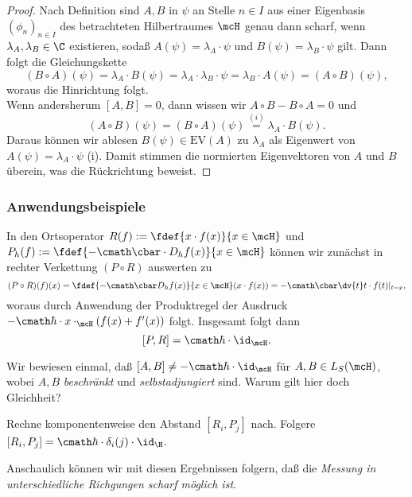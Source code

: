 \documentclass{subfiles}
\begin{document}
        \begin{proof}
            Nach Definition sind $A,B$ in $\psi$ an Stelle $n\in I$ aus einer Eigenbasis $(\phi_n)_{n\in I}$ des betrachteten Hilbertraumes $\mcH$ genau dann scharf, wenn $\lambda_A,\lambda_B\in\C$ existieren, sodaß $A(\psi)=\lambda_A\cdot\psi$ und $B(\psi) = \lambda_B\cdot\psi$ gilt. Dann folgt die Gleichungskette
            \[(B\circ A)(\psi) = \lambda_A\cdot B(\psi) = \lambda_A\cdot\lambda_B\cdot\psi = \lambda_B\cdot A(\psi) = (A\circ B)(\psi),\]
            woraus die Hinrichtung folgt. \\

            Wenn andersherum $[A,B] = 0$, dann wissen wir $A\circ B - B\circ A = 0$ und
            \[(A\circ B)(\psi) = (B\circ A)(\psi) \stackrel{(i)}{=} \lambda_A\cdot B(\psi).\]
            Daraus können wir ablesen $B(\psi)\in\text{EV}(A)$ zu $\lambda_A$ als Eigenwert von $A(\psi) = \lambda_A\cdot\psi$ (i). Damit stimmen die normierten Eigenvektoren von $A$ und $B$ überein, was die Rückrichtung beweist. 
        \end{proof}

        \subsubsection*{Anwendungsbeispiele}
            In den Ortsoperator $R(f):=\fdef{x\cdot f(x)}{x\in\mcH}$ und $P_h(f):=\fdef{-\cmath\cbar\cdot D_hf(x)}{x\in\mcH}$ können wir zunächst in rechter Verkettung $(P\circ R)$ auswerten zu 
            \[(P\circ R)(f)(x) = \fdef{-\cmath\cbar D_hf(x)}{x\in\mcH}(x\cdot f(x)) = -\cmath\cbar \dv{t}t\cdot f(t)|_{t = x},\]
            woraus durch Anwendung der Produktregel der Ausdruck $-\cmath\hbar\cdot x\cdot_\mcH (f(x)+f'(x))$ folgt. Insgesamt folgt dann
            \[[P,R] = \cmath\hbar\cdot \id_\mcH.\]

            \begin{Aufgabe}
                \nr{} Wir bewiesen einmal, daß $[A,B]\neq-\cmath\hbar\cdot\id_\mcH$ für $A,B\in L_S(\mcH)$, wobei $A,B$ \emph{beschränkt} und \emph{selbstadjungiert} sind. Warum gilt hier doch Gleichheit?

                \nr{} Rechne komponentenweise den Abstand $[R_i,P_j]$ nach. Folgere $[R_i,P_j] = \cmath\hbar\cdot\delta_i(j)\cdot\id_\H$. 
            \end{Aufgabe}
            Anschaulich können wir mit diesen Ergebnissen folgern, daß die \textit{Messung in unterschiedliche Richgungen scharf möglich ist}. \\
\end{document}
